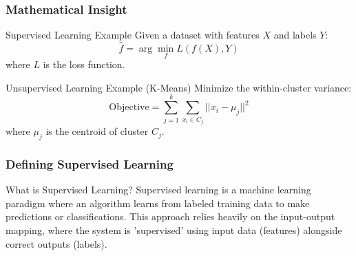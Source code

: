 \documentclass[aspectratio=169]{beamer}
\begin{document}
\begin{frame}[fragile]
    \frametitle{Mathematical Insight}
    \begin{block}{Supervised Learning Example}
        Given a dataset with features \( X \) and labels \( Y \):
        \begin{equation}
            \hat{f} = \arg \min_f L(f(X), Y)
        \end{equation}
        where \( L \) is the loss function.
    \end{block}
    
    \begin{block}{Unsupervised Learning Example (K-Means)}
        Minimize the within-cluster variance:
        \begin{equation}
            \text{Objective} = \sum_{j=1}^{k} \sum_{x_i \in C_j} || x_i - \mu_j ||^2
        \end{equation}
        where \( \mu_j \) is the centroid of cluster \( C_j \).
    \end{block}
\end{frame}

\begin{frame}[fragile]
    \frametitle{Defining Supervised Learning}
    \begin{block}{What is Supervised Learning?}
        Supervised learning is a machine learning paradigm where an algorithm learns from labeled training data to make predictions or classifications. This approach relies heavily on the input-output mapping, where the system is 'supervised' using input data (features) alongside correct outputs (labels).
    \end{block}
\end{frame}
\end{document}
